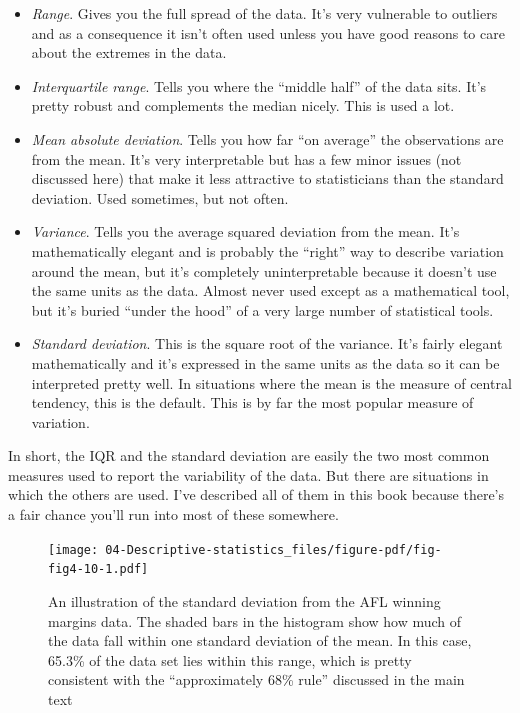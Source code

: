 \documentclass[
  a4paper,
]{book}
\providecommand{\tightlist}{%
  \setlength{\itemsep}{0pt}\setlength{\parskip}{0pt}}\usepackage{longtable,booktabs,array}
\begin{document}
\begin{itemize}
\tightlist
\item
  \emph{Range}. Gives you the full spread of the data. It's very
  vulnerable to outliers and as a consequence it isn't often used unless
  you have good reasons to care about the extremes in the data.
\item
  \emph{Interquartile range}. Tells you where the ``middle half'' of the
  data sits. It's pretty robust and complements the median nicely. This
  is used a lot.
\item
  \emph{Mean absolute deviation}. Tells you how far ``on average'' the
  observations are from the mean. It's very interpretable but has a few
  minor issues (not discussed here) that make it less attractive to
  statisticians than the standard deviation. Used sometimes, but not
  often.
\item
  \emph{Variance}. Tells you the average squared deviation from the
  mean. It's mathematically elegant and is probably the ``right'' way to
  describe variation around the mean, but it's completely
  uninterpretable because it doesn't use the same units as the data.
  Almost never used except as a mathematical tool, but it's buried
  ``under the hood'' of a very large number of statistical tools.
\item
  \emph{Standard deviation}. This is the square root of the variance.
  It's fairly elegant mathematically and it's expressed in the same
  units as the data so it can be interpreted pretty well. In situations
  where the mean is the measure of central tendency, this is the
  default. This is by far the most popular measure of variation.
\end{itemize}

In short, the IQR and the standard deviation are easily the two most
common measures used to report the variability of the data. But there
are situations in which the others are used. I've described all of them
in this book because there's a fair chance you'll run into most of these
somewhere.

\begin{figure}

\texttt{[image: 04-Descriptive-statistics\_files/figure-pdf/fig-fig4-10-1.pdf]} \hfill{}

\caption{\label{fig-fig4-10}An illustration of the standard deviation
from the AFL winning margins data. The shaded bars in the histogram show
how much of the data fall within one standard deviation of the mean. In
this case, 65.3\% of the data set lies within this range, which is
pretty consistent with the ``approximately 68\% rule'' discussed in the
main text}

\end{figure}
\end{document}
